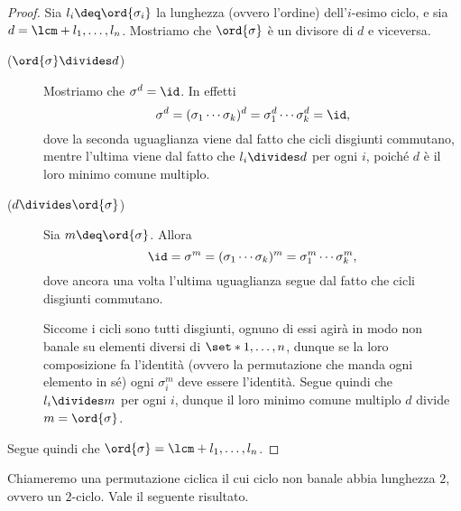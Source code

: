 \begin{proof}
    Sia $l_i \deq \ord{\sigma_i}$ la lunghezza (ovvero l'ordine) dell'$i$-esimo ciclo, e sia $d = \lcm+{l_1, \dots, l_n}$. Mostriamo che $\ord{\sigma}$ è un divisore di $d$ e viceversa.
    
    \begin{description}
        \item[($\ord{\sigma} \divides d$)] Mostriamo che $\sigma^d = \id$. In effetti \[
            \sigma^d 
            = (\sigma_1\cdots\sigma_k)^d 
            = \sigma_1^d\cdots\sigma_k^d 
            = \id,
        \] dove la seconda uguaglianza viene dal fatto che cicli disgiunti commutano, mentre l'ultima viene dal fatto che $l_i \divides d$ per ogni $i$, poiché $d$ è il loro minimo comune multiplo.
        \item[($d \divides \ord{\sigma}$)] Sia $m \deq \ord{\sigma}$. Allora \[
            \id = \sigma^m = (\sigma_1\cdots\sigma_k)^m = \sigma_1^m \cdots \sigma_k^m,
        \] dove ancora una volta l'ultima uguaglianza segue dal fatto che cicli disgiunti commutano. 
        
        Siccome i cicli sono tutti disgiunti, ognuno di essi agirà in modo non banale su elementi diversi di $\set*{1, \dots, n}$, dunque se la loro composizione fa l'identità (ovvero la permutazione che manda ogni elemento in sé) ogni $\sigma_i^m$ deve essere l'identità. Segue quindi che $l_i \divides m$ per ogni $i$, dunque il loro minimo comune multiplo $d$ divide $m = \ord{\sigma}$.  
    \end{description}

    Segue quindi che $\ord{\sigma} = \lcm+{l_1, \dots, l_n}$. 
\end{proof}

Chiameremo  una permutazione ciclica il cui ciclo non banale abbia lunghezza $2$, ovvero un $2$-ciclo. Vale il seguente risultato.

